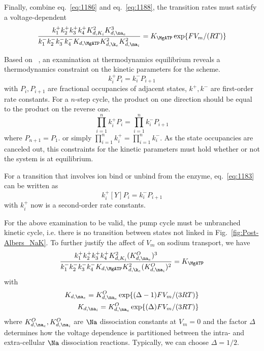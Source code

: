 Finally, combine eq.~\eqref{eq:1186} and eq.~\eqref{eq:1188}, the
transition rates must satisfy a voltage-dependent
\begin{equation}
  \label{eq:1189}
  \frac{k^+_1k^+_2k^+_3k^+_4K^2_{d,K_i}K^3_{d,\na_e}}{k^-_1k^-_2k^-_3k^-_4K_{d,\MgATP}K^2_{d,\k_e}K^2_{d,\na_i}}
  =  K_\MgATP\exp\{FV_m/(RT)\}
\end{equation}


\begin{framed}
  Based on ~\citep{hill1989}, an examination at thermodynamics
  equilibrium reveals a thermodynamics constraint on the kinetic
  parameters for the scheme. 
  \begin{equation}
    \label{eq:1183}
    k^+_i P_i = k^-_i P_{i+1}
  \end{equation}
  with $P_i, P_{i+1}$ are fractional occupancies of adjacent states,
  $k^+, k^-$ are first-order rate constants. For a $n$-step cycle, the
  product on one direction should be equal to the product on the
  reverse one.
  \begin{equation}
    \label{eq:1184}
    \prod_{i=1}^n k^+_i P_i = \prod_{i=1}^n k^-_i P_{i+1}
  \end{equation}
  where $P_{n+1} = P_1$. or simply $ \prod_{i=1}^n k^+_i = \prod_{i=1}^n
  k^-_i $. As the state occupancies are canceled out, this constraints
  for the kinetic parameters must hold whether or not the system is at
  equilibrium. 

  For a transition that involves ion bind or unbind from the enzyme,
  eq.~\eqref{eq:1183} can be written as
  \begin{equation}
    \label{eq:1185}
    k^+_i [Y]P_i = k^-_i P_{i+1}
  \end{equation}
  with $k^+_i$ now is a second-order rate constants. 
\end{framed}

For the above examination to be valid, the pump cycle must be
unbranched kinetic cycle, i.e. there is no transition between states
not linked in Fig.~\ref{fig:Post-Albers_NaK}. To further justify the
affect of $V_m$ on sodium transport, we have
\begin{equation}
  \label{eq:1190}
  \frac{k^+_1k^+_2k^+_3k^+_4K^2_{d,K_i}(K^O_{d,\na_e})^3}{k^-_1k^-_2k^-_3k^-_4K_{d,\MgATP}K^2_{d,\k_e}(K^O_{d,\na_i})^2}
  =  K_\MgATP
\end{equation}
with
\begin{equation}
  \label{eq:1191}
  \begin{split}
    K_{d,\na_e}= K^O_{d,\na_e}\exp\{(\Delta-1)FV_m/(3RT)\} \\
    K_{d,\na_i}= K^O_{d,\na_e}\exp\{(\Delta)FV_m/(3RT)\} \\
  \end{split}
\end{equation}
where $K^O_{d,\na_e},K^O_{d,\na_i}$ are $\Na$ dissociation constants
at $V_m=0$ and the factor $\Delta$ determines how the voltage
dependence is partitioned between the intra- and extra-cellular $\Na$
dissociation reactions. Typically, we can choose $\Delta =1/2$. 

